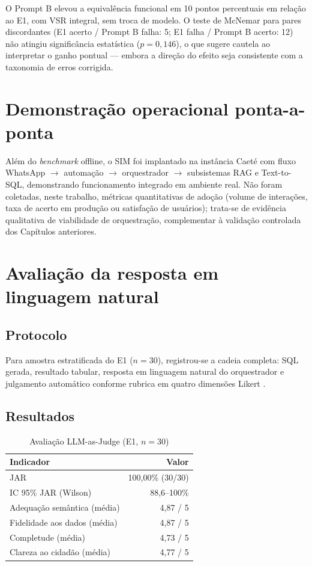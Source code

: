 O Prompt B elevou a equivalência funcional em 10 pontos percentuais em relação ao E1, com VSR integral, sem troca de modelo. O teste de McNemar para pares discordantes (E1 acerto / Prompt B falha: 5; E1 falha / Prompt B acerto: 12) não atingiu significância estatística ($p = 0{,}146$), o que sugere cautela ao interpretar o ganho pontual --- embora a direção do efeito seja consistente com a taxonomia de erros corrigida.

\section{Demonstração operacional ponta-a-ponta}

Além do \textit{benchmark} offline, o SIM foi implantado na instância Caeté com fluxo WhatsApp $\rightarrow$ automação $\rightarrow$ orquestrador $\rightarrow$ subsistemas RAG e Text-to-SQL, demonstrando funcionamento integrado em ambiente real. Não foram coletadas, neste trabalho, métricas quantitativas de adoção (volume de interações, taxa de acerto em produção ou satisfação de usuários); trata-se de evidência qualitativa de viabilidade de orquestração, complementar à validação controlada dos Capítulos anteriores.

\section{Avaliação da resposta em linguagem natural}

\subsection{Protocolo}

Para amostra estratificada do E1 ($n=30$), registrou-se a cadeia completa: SQL gerada, resultado tabular, resposta em linguagem natural do orquestrador e julgamento automático conforme rubrica em quatro dimensões Likert \cite{Zheng2023LLMJudge}.

\subsection{Resultados}

\begin{table}[htbp]
\centering
\caption{Avaliação LLM-as-Judge (E1, $n=30$)}
\label{tab:jar}
\begin{tabular}{lr}
\toprule
\textbf{Indicador} & \textbf{Valor} \\
\midrule
JAR & 100,00\% (30/30) \\
IC 95\% JAR (Wilson) & 88,6--100\% \\
Adequação semântica (média) & 4,87 / 5 \\
Fidelidade aos dados (média) & 4,87 / 5 \\
Completude (média) & 4,73 / 5 \\
Clareza ao cidadão (média) & 4,77 / 5 \\
\bottomrule
\end{tabular}
\end{table}

